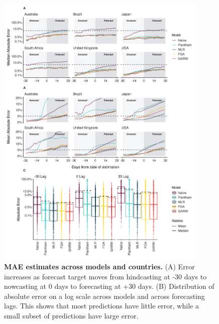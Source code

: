 \documentclass[11pt,oneside,letterpaper]{article}
\begin{document}
\begin{figure}[tb!]
	\centering
	\includegraphics[width=0.9\textwidth]{figures/model_comp.png}
	\caption{\textbf{MAE estimates across models and countries.}
	(A) Error increases as forecast target moves from hindcasting at -30 days to nowcasting at 0 days to forecasting at +30 days.
	(B) Distribution of absolute error on a log scale across models and across forecasting lags.
	This shows that most predictions have little error, while a small subset of predictions have large error.
	}
	\label{fig:model_comp_fig}
\end{figure}
\end{document}
